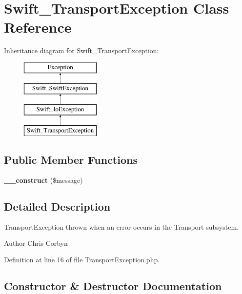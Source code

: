 \section{Swift\+\_\+\+Transport\+Exception Class Reference}
\label{class_swift___transport_exception}
Inheritance diagram for Swift\+\_\+\+Transport\+Exception\+:\begin{figure}[H]
\begin{center}
\leavevmode
\includegraphics[height=4.000000cm]{class_swift___transport_exception}
\end{center}
\end{figure}
\subsection*{Public Member Functions}
\begin{DoxyCompactItemize}
\item 
{\bf \+\_\+\+\_\+construct} (\$message)
\end{DoxyCompactItemize}


\subsection{Detailed Description}
Transport\+Exception thrown when an error occurs in the Transport subsystem.

\begin{DoxyAuthor}{Author}
Chris Corbyn 
\end{DoxyAuthor}


Definition at line 16 of file Transport\+Exception.\+php.



\subsection{Constructor \& Destructor Documentation}
